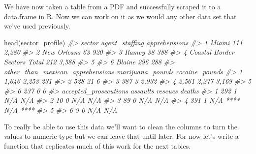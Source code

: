 \documentclass[
]{krantz}
\makeatletter
\newenvironment{Shaded}{\begin{snugshade}}{\end{snugshade}}
\newcommand{\CommentTok}[1]{\textcolor[rgb]{0.37,0.37,0.37}{\textit{#1}}}
\newcommand{\FunctionTok}[1]{\textcolor[rgb]{0,0,0}{#1}}
\newcommand{\NormalTok}[1]{#1}
\newenvironment{kframe}{%
\medskip{}
\setlength{\fboxsep}{.8em}
 \def\at@end@of@kframe{}%
 \ifinner\ifhmode%
  \def\at@end@of@kframe{\end{minipage}}%
  \begin{minipage}{\columnwidth}%
 \fi\fi%
 \def\FrameCommand##1{\hskip\@totalleftmargin \hskip-\fboxsep
 \colorbox{shadecolor}{##1}\hskip-\fboxsep
     \hskip-\linewidth \hskip-\@totalleftmargin \hskip\columnwidth}%
 \MakeFramed {\advance\hsize-\width
   \@totalleftmargin\z@ \linewidth\hsize
   \@setminipage}}%
 {\par\unskip\endMakeFramed%
 \at@end@of@kframe}
\renewenvironment{Shaded}{\begin{kframe}}{\end{kframe}}
\makeatother
\begin{document}
We have now taken a table from a PDF and successfully scraped it to a data.frame in R. Now we can work on it as we would any other data set that we've used previously.

\begin{Shaded}
\begin{Highlighting}[]
\FunctionTok{head}\NormalTok{(sector\_profile)}
\CommentTok{\#\textgreater{}                         sector agent\_staffing apprehensions}
\CommentTok{\#\textgreater{} 1                        Miami            111         2,280}
\CommentTok{\#\textgreater{} 2                  New Orleans             63           920}
\CommentTok{\#\textgreater{} 3                        Ramey             38           388}
\CommentTok{\#\textgreater{} 4 Coastal Border Sectors Total            212         3,588}
\CommentTok{\#\textgreater{} 5                                                          }
\CommentTok{\#\textgreater{} 6                       Blaine            296           288}
\CommentTok{\#\textgreater{}   other\_than\_mexican\_apprehensions marijuana\_pounds cocaine\_pounds}
\CommentTok{\#\textgreater{} 1                            1,646            2,253            231}
\CommentTok{\#\textgreater{} 2                              528               21              6}
\CommentTok{\#\textgreater{} 3                              387                3          2,932}
\CommentTok{\#\textgreater{} 4                            2,561            2,277          3,169}
\CommentTok{\#\textgreater{} 5                                                                 }
\CommentTok{\#\textgreater{} 6                              237                0              0}
\CommentTok{\#\textgreater{}   accepted\_prosecutions assaults  rescues   deaths}
\CommentTok{\#\textgreater{} 1                   292        1      N/A      N/A}
\CommentTok{\#\textgreater{} 2                    10        0      N/A      N/A}
\CommentTok{\#\textgreater{} 3                    89        0      N/A      N/A}
\CommentTok{\#\textgreater{} 4                   391        1 N/A **** N/A ****}
\CommentTok{\#\textgreater{} 5                                                 }
\CommentTok{\#\textgreater{} 6                     9        0      N/A      N/A}
\end{Highlighting}
\end{Shaded}

To really be able to use this data we'll want to clean the columns to turn the values to numeric type but we can leave that until later. For now let's write a function that replicates much of this work for the next tables.
\end{document}
